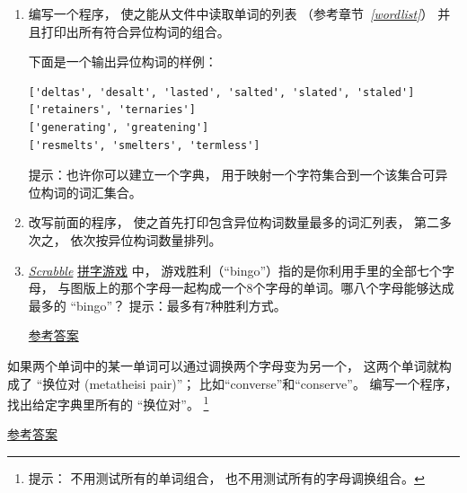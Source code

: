 {\begin{exercise}
\begin{enumerate}
\item 编写一个程序， 使之能从文件中读取单词的列表 （参考章节~{\em \ref{wordlist}}） 并且打印出所有符合异位构词的组合。

下面是一个输出异位构词的样例：

{\em
\begin{lstlisting}
['deltas', 'desalt', 'lasted', 'salted', 'slated', 'staled']
['retainers', 'ternaries']
['generating', 'greatening']
['resmelts', 'smelters', 'termless']
\end{lstlisting}
}

提示：也许你可以建立一个字典， 用于映射一个字符集合到一个该集合可异位构词的词汇集合。

\item 改写前面的程序， 使之首先打印包含异位构词数量最多的词汇列表， 第二多次之， 依次按异位构词数量排列。

\item \href{https://en.wikipedia.org/wiki/Scrabble}{{\em Scrabble}} \href{https://zh.wikipedia.org/wiki/Scrabble}{拼字游戏} 中， 游戏胜利（``bingo''）指的是你利用手里的全部七个字母， 与图版上的那个字母一起构成一个8个字母的单词。哪八个字母能够达成最多的 ``bingo''？ 提示：最多有7种胜利方式。

\href{http://thinkpython2.com/code/anagram_sets.py}{参考答案}

\end{enumerate}

\end{exercise}

\begin{exercise}


如果两个单词中的某一单词可以通过调换两个字母变为另一个， 这两个单词就构成了 
``换位对 (metatheisi pair)''； 比如``converse''和``conserve''。  
编写一个程序， 找出给定字典里所有的 ``换位对''。 
\footnote{提示： 不用测试所有的单词组合， 也不用测试所有的字母调换组合。}

\href{http://thinkpython2.com/code/metathesis.py}{参考答案}


\end{exercise}}
